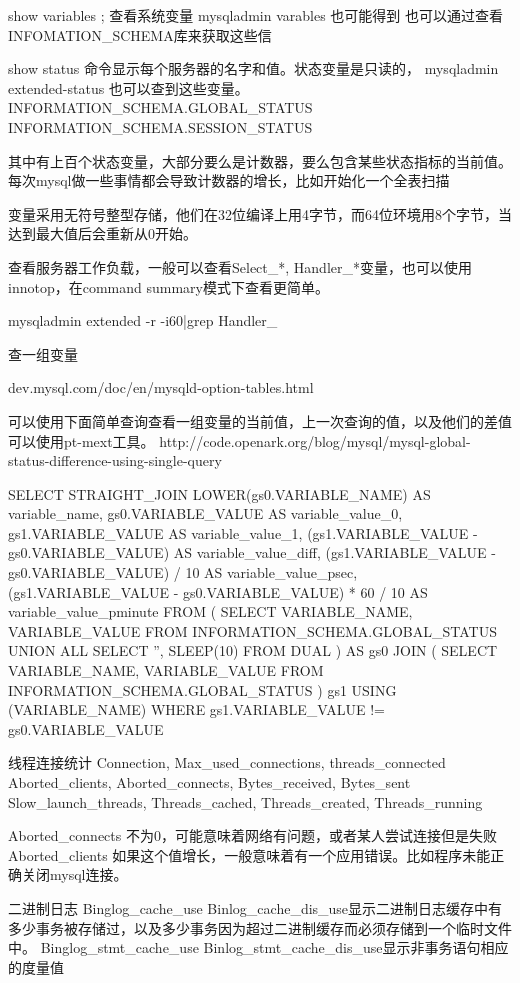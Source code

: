 
show variables ; 查看系统变量
mysqladmin varables  也可能得到
也可以通过查看INFOMATION_SCHEMA库来获取这些信

show status 命令显示每个服务器的名字和值。状态变量是只读的，
mysqladmin extended-status 也可以查到这些变量。
INFORMATION_SCHEMA.GLOBAL_STATUS
INFORMATION_SCHEMA.SESSION_STATUS

其中有上百个状态变量，大部分要么是计数器，要么包含某些状态指标的当前值。每次mysql做一些事情都会导致计数器的增长，比如开始化一个全表扫描

变量采用无符号整型存储，他们在32位编译上用4字节，而64位环境用8个字节，当达到最大值后会重新从0开始。

查看服务器工作负载，一般可以查看Select_*, Handler_*变量，也可以使用innotop，在command summary模式下查看更简单。

mysqladmin extended -r -i60|grep Handler_ 

查一组变量 


dev.mysql.com/doc/en/mysqld-option-tables.html

可以使用下面简单查询查看一组变量的当前值，上一次查询的值，以及他们的差值 可以使用pt-mext工具。
http://code.openark.org/blog/mysql/mysql-global-status-difference-using-single-query

SELECT STRAIGHT_JOIN
   LOWER(gs0.VARIABLE_NAME) AS variable_name,
   gs0.VARIABLE_VALUE AS variable_value_0,
   gs1.VARIABLE_VALUE AS variable_value_1,
   (gs1.VARIABLE_VALUE - gs0.VARIABLE_VALUE) AS variable_value_diff,
   (gs1.VARIABLE_VALUE - gs0.VARIABLE_VALUE) / 10 AS variable_value_psec,
   (gs1.VARIABLE_VALUE - gs0.VARIABLE_VALUE) * 60 / 10 AS
variable_value_pminute
FROM
   (
     SELECT
       VARIABLE_NAME,
       VARIABLE_VALUE
     FROM
       INFORMATION_SCHEMA.GLOBAL_STATUS
     UNION ALL
     SELECT
       '',
       SLEEP(10)
     FROM DUAL
   ) AS gs0
   JOIN (
     SELECT 
       VARIABLE_NAME,
       VARIABLE_VALUE
     FROM 
       INFORMATION_SCHEMA.GLOBAL_STATUS
   ) gs1 USING (VARIABLE_NAME)
WHERE
   gs1.VARIABLE_VALUE != gs0.VARIABLE_VALUE

线程连接统计
Connection, Max_used_connections, threads_connected
Aborted_clients, Aborted_connects, Bytes_received, Bytes_sent
Slow_launch_threads, Threads_cached, Threads_created, Threads_running

Aborted_connects  不为0，可能意味着网络有问题，或者某人尝试连接但是失败
Aborted_clients 如果这个值增长，一般意味着有一个应用错误。比如程序未能正确关闭mysql连接。


二进制日志
Binglog_cache_use  Binlog_cache_dis_use显示二进制日志缓存中有多少事务被存储过，以及多少事务因为超过二进制缓存而必须存储到一个临时文件中。
Binglog_stmt_cache_use  Binlog_stmt_cache_dis_use显示非事务语句相应的度量值


